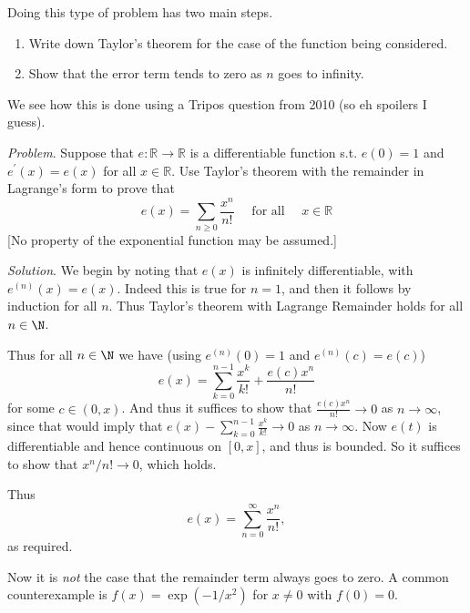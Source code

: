 Doing this type of problem has two main steps.
\begin{enumerate}
	\item Write down Taylor's theorem for the case of the function being considered.
	\item Show that the error term tends to zero as $n$ goes to infinity.
\end{enumerate}
We see how this is done using a Tripos question from 2010 (so eh spoilers I guess).

\begin{example}
\emph{Problem}. Suppose that $e: \mathbb{R} \rightarrow \mathbb{R}$ is a differentiable function s.t. $e(0)=1$ and $e^{\prime}(x)=e(x)$ for all $x \in \mathbb{R}$. Use Taylor's theorem with the remainder in Lagrange's form to prove that
$$
e(x)=\sum_{n \geqslant 0} \frac{x^{n}}{n !} \quad \text { for all } \quad x \in \mathbb{R}
$$
[No property of the exponential function may be assumed.]

\emph{Solution}. We begin by noting that $e(x)$ is infinitely differentiable, with $e^{(n)}(x) = e(x)$. Indeed this is true for $n = 1$, and then it follows by induction for all $n$. Thus Taylor's theorem with Lagrange Remainder holds for all $n \in \N$.

Thus for all $n \in \N$ we have (using $e^{(n)}(0) = 1$ and $e^{(n)}(c) = e(c)$)
$$
e(x) = \sum_{k = 0}^{n - 1}\frac{x^k}{k!} + \frac{e(c) x^n}{n!} 
$$
for some $c \in (0, x)$.
And thus it suffices to show that $\frac{e(c)x^n}{n!} \rightarrow 0$ as $n \rightarrow \infty$, since that would imply that $e(x) - \sum_{k = 0}^{n - 1} \frac{x^k}{k!} \rightarrow 0$ as $n \rightarrow \infty$.
Now $e(t)$ is differentiable and hence continuous on $[0, x]$, and thus is bounded. So it suffices to show that $x^n/n! \rightarrow 0$, which holds.

Thus
$$
e(x) = \sum_{n = 0}^{\infty} \frac{x^n}{n!},
$$
as required.
\end{example}


Now it is \emph{not} the case that the remainder term always goes to zero. A common counterexample is $f(x) = \exp(-1/x^2)$ for $x \neq 0$ with $f(0) = 0$.

\clearpage